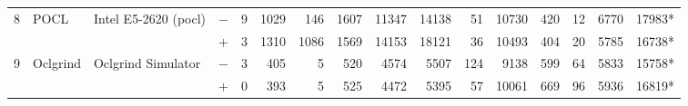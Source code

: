 \begin{tabular}{llll | rrrrrr | rrrrrr }
\hline
\multirow{ 2}{*}{8} & \multirow{ 2}{*}{POCL} & \multirow{ 2}{*}{Intel E5-2620 (pocl)} & $-$ & 9 & 1029 & 146 & 1607 & 11347 & 14138       & 51 & 10730 & 420 & 12 & 6770 & 17983* \\& & & $+$ & 3 & 1310 & 1086 & 1569 & 14153 & 18121 & 36 & 10493 & 404 & 20 & 5785 & 16738* \\
\hline
\multirow{ 2}{*}{9} & \multirow{ 2}{*}{Oclgrind} & \multirow{ 2}{*}{Oclgrind Simulator} & $-$ & 3 & 405 & 5 & 520 & 4574 & 5507       & 124 & 9138 & 599 & 64 & 5833 & 15758* \\& & & $+$ & 0 & 393 & 5 & 525 & 4472 & 5395 & 57 & 10061 & 669 & 96 & 5936 & 16819* \\
  \bottomrule
\end{tabular}

